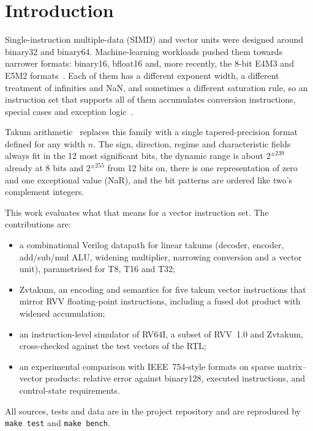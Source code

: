 \documentclass[conference]{IEEEtran}
\newcommand{\code}[1]{\texttt{#1}}
\begin{document}
\section{Introduction}

Single-instruction multiple-data (SIMD) and vector units were designed around binary32 and binary64.
Machine-learning workloads pushed them towards narrower formats: binary16, bfloat16 and, more recently,
the 8-bit E4M3 and E5M2 formats~\cite{ofp8}. Each of them has a different exponent width, a different
treatment of infinities and NaN, and sometimes a different saturation rule, so an instruction set that
supports all of them accumulates conversion instructions, special cases and exception
logic~\cite{hunhold2025avx}.

Takum arithmetic~\cite{hunhold2024takum} replaces this family with a single tapered-precision format
defined for any width $n$. The sign, direction, regime and characteristic fields always fit in the 12
most significant bits, the dynamic range is about $2^{\pm 239}$ already at 8 bits and $2^{\pm 255}$ from 12 bits on, there is one
representation of zero and one exceptional value (NaR), and the bit patterns are ordered like two's
complement integers.

This work evaluates what that means for a vector instruction set. The contributions are:
\begin{itemize}
  \item a combinational Verilog datapath for linear takums (decoder, encoder, add/sub/mul ALU,
        widening multiplier, narrowing conversion and a vector unit), parametrised for T8, T16 and T32;
  \item Zvtakum, an encoding and semantics for five takum vector instructions that mirror RVV
        floating-point instructions, including a fused dot product with widened accumulation;
  \item an instruction-level simulator of RV64I, a subset of RVV~1.0 and Zvtakum, cross-checked against
        the test vectors of the RTL;
  \item an experimental comparison with IEEE~754-style formats on sparse matrix--vector products:
        relative error against binary128, executed instructions, and control-state requirements.
\end{itemize}
All sources, tests and data are in the project repository and are reproduced by \code{make test} and
\code{make bench}.
\end{document}
